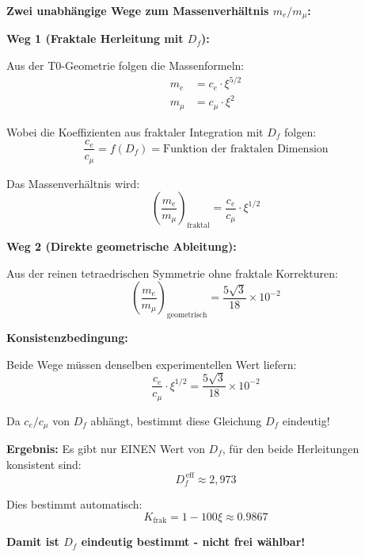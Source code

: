 	\begin{tcolorbox}[colback=red!5!white,colframe=red!75!black,title={Eindeutige Bestimmung von $K_{\text{frak}}$ und $D_f$}]
		\textbf{Zwei unabhängige Wege zum Massenverhältnis $m_e/m_\mu$:}
		
		\textbf{Weg 1 (Fraktale Herleitung mit $D_f$):}
		
		Aus der T0-Geometrie folgen die Massenformeln:
		\begin{align}
			m_e &= c_e \cdot \xi^{5/2} \\
			m_\mu &= c_\mu \cdot \xi^2
		\end{align}
		
		Wobei die Koeffizienten aus fraktaler Integration mit $D_f$ folgen:
		\begin{equation}
			\frac{c_e}{c_\mu} = f(D_f) = \text{Funktion der fraktalen Dimension}
		\end{equation}
		
		Das Massenverhältnis wird:
		\begin{equation}
			\left(\frac{m_e}{m_\mu}\right)_{\text{fraktal}} = \frac{c_e}{c_\mu} \cdot \xi^{1/2}
		\end{equation}
		
		\textbf{Weg 2 (Direkte geometrische Ableitung):}
		
		Aus der reinen tetraedrischen Symmetrie ohne fraktale Korrekturen:
		\begin{equation}
			\left(\frac{m_e}{m_\mu}\right)_{\text{geometrisch}} = \frac{5\sqrt{3}}{18} \times 10^{-2}
		\end{equation}
		
		\textbf{Konsistenzbedingung:}
		
		Beide Wege müssen denselben experimentellen Wert liefern:
		\begin{equation}
			\frac{c_e}{c_\mu} \cdot \xi^{1/2} = \frac{5\sqrt{3}}{18} \times 10^{-2}
		\end{equation}
		
		Da $c_e/c_\mu$ von $D_f$ abhängt, bestimmt diese Gleichung $D_f$ eindeutig!
		
		\textbf{Ergebnis:} Es gibt nur EINEN Wert von $D_f$, für den beide Herleitungen konsistent sind:
		\begin{equation}
			D_f^{\,\text{eff}} \approx 2{,}973
		\end{equation}
		
		Dies bestimmt automatisch:
		\begin{equation}
			K_{\text{frak}} = 1 - 100\xi \approx 0.9867
		\end{equation}
		
		\textbf{Damit ist $D_f$ eindeutig bestimmt - nicht frei wählbar!}
	\end{tcolorbox}

